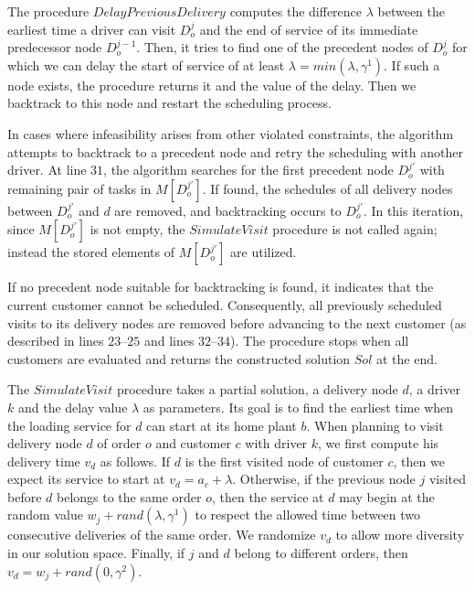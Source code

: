 \documentclass[authoryear,preprint,review,11pt]{elsarticle}
\begin{document}
The procedure $DelayPreviousDelivery$ computes the difference $\lambda$ between the earliest time a driver can visit $D^{j}_o$ and the end of service of its immediate predecessor node $D^{j-1}_o$. Then, it tries to find one of the precedent nodes of $D^{j}_o$ for which we can delay the start of service of at least $\lambda = min(\lambda,\gamma^1)$. If such a node exists, the procedure returns it and the value of the delay. Then we backtrack to this node and restart the scheduling process.

In cases where infeasibility arises from other violated constraints, the algorithm attempts to backtrack to a precedent node and retry the scheduling with another driver. At line $31$, the algorithm searches for the first precedent node $D^{j'}_o$ with remaining pair of tasks in $M[D^{j'}_o]$. If found, the schedules of all delivery nodes between $D^{j'}_o$ and $d$ are removed, and backtracking occurs to $D^{j'}_o$. In this iteration, since $M[D^{j'}_o]$ is not empty, the $SimulateVisit$ procedure is not called again; instead the stored elements of $M[D^{j'}_o]$ are utilized.

If no precedent node suitable for backtracking is found, it indicates that the current customer cannot be scheduled. Consequently, all previously scheduled visits to its delivery nodes are removed before advancing to the next customer (as described in lines $23$--$25$ and lines $32$--$34$). The procedure stops when all customers are evaluated and returns the constructed solution $Sol$ at the end.

The $SimulateVisit$ procedure takes a partial solution, a delivery node $d$, a driver $k$ and the delay value $\lambda$ as parameters. Its goal is to find the earliest time when the loading service for $d$ can start at its home plant $b$. When planning to visit delivery node $d$ of order $o$ and customer $c$ with driver $k$, we first compute his delivery time $v_d$ as follows. If $d$ is the first  visited node of customer $c$, then we expect its service to start at $v_d = a_c + \lambda$. Otherwise, if the previous node $j$ visited before $d$ belongs to the same order $o$, then the service at $d$ may begin at the random value $w_j + rand(\lambda, \gamma^1)$ to respect the allowed time between two consecutive deliveries of the same order. We randomize $v_d$ to allow more diversity in our solution space. Finally, if $j$ and $d$ belong to different orders, then $v_d = w_j + rand(0,\gamma^2)$.
\end{document}
